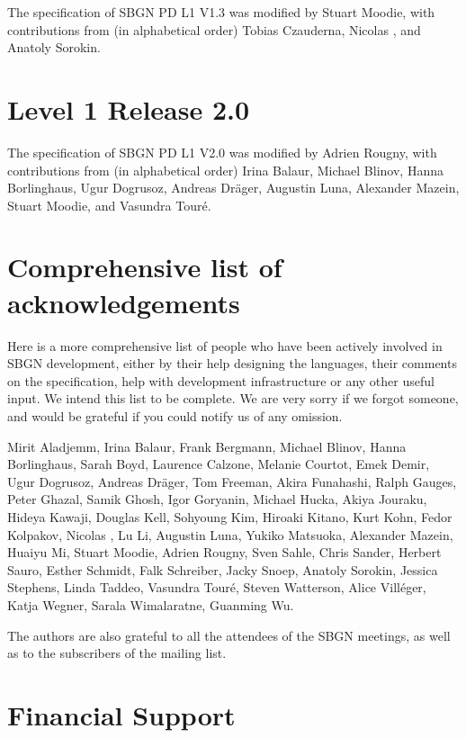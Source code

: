 The specification of SBGN PD L1 V1.3 was modified by Stuart Moodie, with contributions from (in alphabetical order) Tobias Czauderna, Nicolas \lenov{}, and Anatoly Sorokin.

\section{Level 1 Release 2.0}

The specification of SBGN PD L1 V2.0 was modified by Adrien Rougny, with contributions from (in alphabetical order) Irina Balaur, Michael Blinov, Hanna Borlinghaus, Ugur Dogrusoz, Andreas Dräger, Augustin Luna, Alexander Mazein, Stuart Moodie, and Vasundra Touré.


\section{Comprehensive list of acknowledgements}

Here is a more comprehensive list of people who have been actively involved in SBGN development, either by their help designing the languages, their comments on the specification, help with development infrastructure or any other useful input.  We intend this list to be complete. We are very sorry if we forgot someone, and would be grateful if you could notify us of any omission.

Mirit Aladjemm, Irina Balaur, Frank Bergmann, Michael Blinov, Hanna Borlinghaus, Sarah Boyd, Laurence Calzone, Melanie Courtot, Emek Demir, Ugur Dogrusoz, Andreas Dräger, Tom Freeman, Akira Funahashi, Ralph Gauges, Peter Ghazal, Samik Ghosh, Igor Goryanin, Michael Hucka, Akiya Jouraku, Hideya Kawaji, Douglas Kell, Sohyoung Kim, Hiroaki Kitano, Kurt Kohn, Fedor Kolpakov, Nicolas \lenov{}, Lu Li, Augustin Luna, Yukiko Matsuoka, Alexander Mazein, Huaiyu Mi, Stuart Moodie, Adrien Rougny, Sven Sahle, Chris Sander, Herbert Sauro, Esther Schmidt, Falk Schreiber, Jacky Snoep, Anatoly Sorokin, Jessica Stephens, Linda Taddeo, Vasundra Touré, Steven Watterson, Alice Vill\'{e}ger, Katja Wegner, Sarala Wimalaratne, Guanming Wu.


The authors are also grateful to all the attendees of the SBGN meetings, as 
well as to the subscribers of the  mailing list.


\section{Financial Support}

